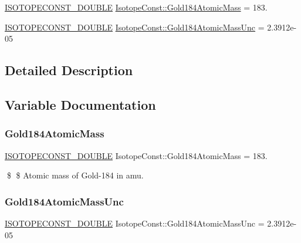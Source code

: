\begin{DoxyCompactItemize}
\item 
\mbox{\hyperlink{group___isotope_const-_macros_ga8f45a7272ce02c0b4c65c44636ed719a}{I\+S\+O\+T\+O\+P\+E\+C\+O\+N\+S\+T\+\_\+\+D\+O\+U\+B\+LE}} \mbox{\hyperlink{group___isotope_const-_gold-_au184_gabe6d2922a0fcb6076473282a73a0aad9}{Isotope\+Const\+::\+Gold184\+Atomic\+Mass}} = 183.
\item 
\mbox{\hyperlink{group___isotope_const-_macros_ga8f45a7272ce02c0b4c65c44636ed719a}{I\+S\+O\+T\+O\+P\+E\+C\+O\+N\+S\+T\+\_\+\+D\+O\+U\+B\+LE}} \mbox{\hyperlink{group___isotope_const-_gold-_au184_ga2b625c1dbda2508124ec18f1878a147c}{Isotope\+Const\+::\+Gold184\+Atomic\+Mass\+Unc}} = 2.\+3912e-\/05
\end{DoxyCompactItemize}


\subsection{Detailed Description}


\subsection{Variable Documentation}
\mbox{\label{group___isotope_const-_gold-_au184_gabe6d2922a0fcb6076473282a73a0aad9}} 
\subsubsection{\texorpdfstring{Gold184\+Atomic\+Mass}{Gold184AtomicMass}}
{\footnotesize\ttfamily \mbox{\hyperlink{group___isotope_const-_macros_ga8f45a7272ce02c0b4c65c44636ed719a}{I\+S\+O\+T\+O\+P\+E\+C\+O\+N\+S\+T\+\_\+\+D\+O\+U\+B\+LE}} Isotope\+Const\+::\+Gold184\+Atomic\+Mass = 183.}

\$ \$ Atomic mass of Gold-\/184 in amu. \mbox{\label{group___isotope_const-_gold-_au184_ga2b625c1dbda2508124ec18f1878a147c}} 
\subsubsection{\texorpdfstring{Gold184\+Atomic\+Mass\+Unc}{Gold184AtomicMassUnc}}
{\footnotesize\ttfamily \mbox{\hyperlink{group___isotope_const-_macros_ga8f45a7272ce02c0b4c65c44636ed719a}{I\+S\+O\+T\+O\+P\+E\+C\+O\+N\+S\+T\+\_\+\+D\+O\+U\+B\+LE}} Isotope\+Const\+::\+Gold184\+Atomic\+Mass\+Unc = 2.\+3912e-\/05}

